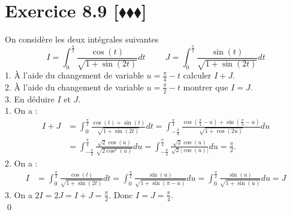 \documentclass[10pt]{article}
\begin{document}
\section*{Exercice 8.9 [$\blacklozenge\blacklozenge\blacklozenge$]}
\begin{tcolorbox}[enhanced, width=7in, center, size=fbox, fontupper=\large, drop shadow southwest]
    On considère les deux intégrales suivantes
    \begin{equation*}
        I=\int_0^{\frac{\pi}{2}}{\frac{\cos(t)}{\sqrt{1+\sin(2t)}}dt} \hspace{1cm} J=\int_0^{\frac{\pi}{2}}{\frac{\sin(t)}{\sqrt{1+\sin(2t)}}dt}
    \end{equation*}
    1. À l'aide du changement de variable $u=\frac{\pi}{4}-t$ calculer $I+J$.\\
    2. À l'aide du changement de variable $u=\frac{\pi}{2}-t$ montrer que $I=J$.\\
    3. En déduire $I$ et $J$.\\[0.1cm]
    1. On a :
    \begin{align*}
        I + J &= \int_0^{\frac{\pi}{2}}{\frac{\cos(t) + \sin(t)}{\sqrt{1+\sin(2t)}}dt}=\int_{-\frac{\pi}{4}}^{\frac{\pi}{4}}{\frac{\cos(\frac{\pi}{4}-u)+\sin(\frac{\pi}{4}-u)}{\sqrt{1+\cos(2u)}}du}\\
        &=\int_{-\frac{\pi}{4}}^{\frac{\pi}{4}}{\frac{\sqrt{2}\cos(u)}{\sqrt{2\cos^2(u)}}du}=\int_{-\frac{\pi}{4}}^{\frac{\pi}{4}}{\frac{\sqrt{2}\cos(u)}{\sqrt{2}|\cos(u)|}du}=\frac{\pi}{2}.
    \end{align*}
    2. On a :
    \begin{align*}
        I &= \int_0^{\frac{\pi}{2}}{\frac{\cos(t)}{\sqrt{1+\sin(2t)}}dt}=\int_0^{\frac{\pi}{2}}{\frac{\sin(u)}{\sqrt{1+\sin(\pi-u)}}du}=\int_0^{\frac{\pi}{2}}{\frac{\sin(u)}{\sqrt{1+\sin(u)}}du}=J
    \end{align*}
    3. On a $2I = 2J = I+J = \frac{\pi}{2}$. Donc $I = J = \frac{\pi}{4}$.\\
    \qed
\end{tcolorbox}

\end{document}
